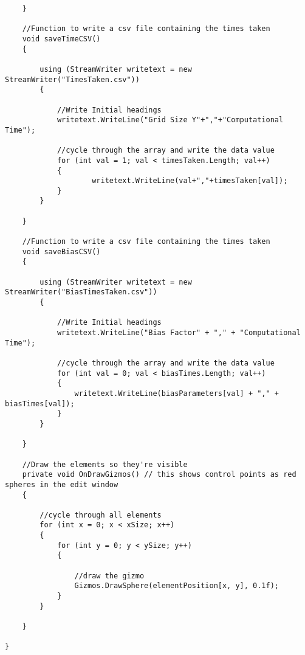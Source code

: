 \begin{mdframed}[linecolor=black, topline=true, bottomline=true,
  leftline=false, rightline=false]
\begin{verbatim}
    }

    //Function to write a csv file containing the times taken
    void saveTimeCSV()
    {

        using (StreamWriter writetext = new StreamWriter("TimesTaken.csv"))
        {

            //Write Initial headings
            writetext.WriteLine("Grid Size Y"+","+"Computational Time");

            //cycle through the array and write the data value
            for (int val = 1; val < timesTaken.Length; val++)
            {   
                    writetext.WriteLine(val+","+timesTaken[val]);
            }
        }

    }

    //Function to write a csv file containing the times taken
    void saveBiasCSV()
    {

        using (StreamWriter writetext = new StreamWriter("BiasTimesTaken.csv"))
        {

            //Write Initial headings
            writetext.WriteLine("Bias Factor" + "," + "Computational Time");

            //cycle through the array and write the data value
            for (int val = 0; val < biasTimes.Length; val++)
            {
                writetext.WriteLine(biasParameters[val] + "," + biasTimes[val]);
            }
        }

    }

    //Draw the elements so they're visible
    private void OnDrawGizmos() // this shows control points as red spheres in the edit window
    {

        //cycle through all elements
        for (int x = 0; x < xSize; x++)
        {
            for (int y = 0; y < ySize; y++)
            {

                //draw the gizmo
                Gizmos.DrawSphere(elementPosition[x, y], 0.1f);
            }
        }

    }

}


\end{verbatim}
\end{mdframed}